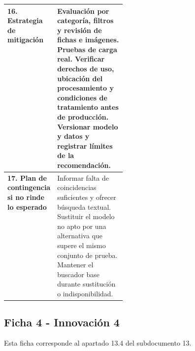 \documentclass[11pt]{article}
\begin{document}
\begin{longtable}{@{}>{\raggedright\arraybackslash}p{0.28\linewidth}>{\raggedright\arraybackslash}p{}@{}}
\\
\midrule
\textbf{16. Estrategia de mitigación}\label{estrategia-de-mitigaciuxf3n-2} &
Evaluación por categoría, filtros y revisión de fichas e imágenes. Pruebas de carga real. Verificar derechos de uso, ubicación del procesamiento y condiciones de tratamiento antes de producción. Versionar modelo y datos y registrar límites de la recomendación.
\\
\midrule
\textbf{17. Plan de contingencia si no rinde lo esperado}\label{plan-de-contingencia-si-no-rinde-lo-esperado-2} &
Informar falta de coincidencias suficientes y ofrecer búsqueda textual. Sustituir el modelo no apto por una alternativa que supere el mismo conjunto de prueba. Mantener el buscador base durante sustitución o indisponibilidad.
\\
\end{longtable}

\subsection*{Ficha 4 - Innovación 4}\label{ficha-4-innovaciuxf3n-4}

Esta ficha corresponde al apartado 13.4 del subdocumento 13.
\end{document}
